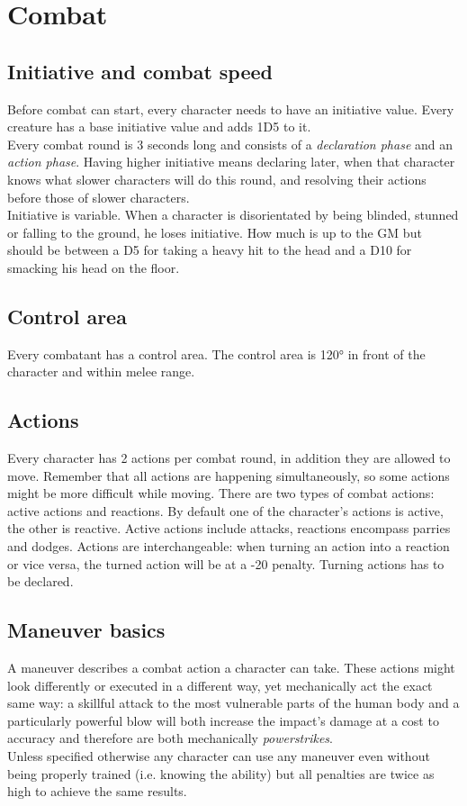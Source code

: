 \documentclass[12pt,a4paper,openany]{book}
\begin{document}
	\chapter{Combat}
	\section{Initiative and combat speed}
	Before combat can start, every character needs to have an initiative value. Every creature has a base initiative value and adds 1D5 to it.\\
	Every combat round is 3 seconds long and consists of a \textit{declaration phase} and an \textit{action phase}. Having higher initiative means declaring later, when that character knows what slower characters will do this round, and resolving their actions before those of slower characters.\\
	Initiative is variable. When a character is disorientated by being blinded, stunned or falling to the ground, he loses initiative. How much is up to the GM but should be between a D5 for taking a heavy hit to the head and a D10 for smacking his head on the floor.
	\section{Control area}
	Every combatant has a control area. The control area is 120° in front of the character and within melee range.
	\section{Actions}
	Every character has 2 actions per combat round, in addition they are allowed to move. Remember that all actions are happening simultaneously, so some actions might be more difficult while moving.
	There are two types of combat actions: active actions and reactions. By default one of the character’s actions is active, the other is reactive. Active actions include attacks, reactions encompass parries and dodges. Actions are interchangeable: when turning an action into a reaction or vice versa, the turned action will be at a -20 penalty. Turning actions has to be declared.
	\section{Maneuver basics}
	A maneuver describes a combat action a character can take. These actions might look differently or executed in a different way, yet mechanically act the exact same way: a skillful attack to the most vulnerable parts of the human body and a particularly powerful blow will both increase the impact’s damage at a cost to accuracy and therefore are both mechanically \textit{powerstrikes}.\\
	Unless specified otherwise any character can use any maneuver even without being properly trained (i.e. knowing the ability) but all penalties are twice as high to achieve the same results.
\end{document}
